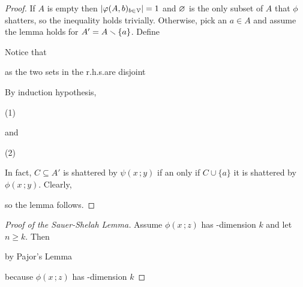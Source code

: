 \documentclass[scombinatorics.tex]{subfiles}
\begin{document}
\begin{proof}
  If $A$ is empty then $|\varphi(A,b)_{b\in\EuScript V}|=1$ and $\varnothing$ is the only subset of $A$ that $\phi$ shatters, so the inequality holds trivially.
  Otherwise, pick an $a\in A$ and assume the lemma holds for $A'=A\smallsetminus\{a\}$.
  Define 


  Notice that
  
  
  as the two sets in the r.h.s.\@ are disjoint


  By induction hypothesis, 

  \hfill(1)
  
  and


  \hfill(2)

  In fact, $C\subseteq A'$ is shattered by $\psi(x\,;y)$ if an only if $C\cup\{a\}$ it is shattered by $\phi(x\,;y)$.
  Clearly, 


  so the lemma follows.
\end{proof}
  
\begin{proof}[Proof of the Sauer-Shelah Lemma]
  Assume $\phi(x\,;z)$ has \vc-dimension $k$ and let $n\ge k$.
  Then

  \smallskip

  \hfill by  Pajor's Lemma\smallskip
  
  \hfill because $\phi(x\,;z)$ has \vc-dimension $k$
\end{proof}
\end{document}
